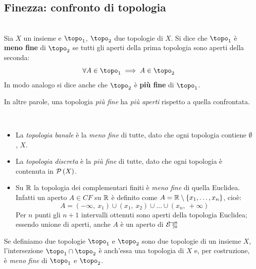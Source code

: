 \subsection{Finezza: confronto di topologia}
\begin{define}[Finezza.]~{}\\
Sia $X$ un insieme e $\topo_1$, $\topo_2$ due topologie di $X$. Si dice che $\topo_1$ è \textbf{meno fine} di $\topo_2$ se tutti gli aperti della prima topologia sono aperti della seconda:
\vspace{-2mm}
\begin{equation}
\forall A\in\topo_1\implies A\in \topo_2
\end{equation}
In modo analogo si dice anche che $\topo_2$ è \textbf{più fine} di $\topo_1$.
\end{define}
In altre parole, una topologia \textit{più fine} ha \textit{più aperti} rispetto a quella confrontata.
\begin{examples}~{}
\begin{itemize}
\item La \textit{topologia banale} è la \textit{meno fine} di tutte, dato che ogni topologia contiene $\emptyset$, $X$.
\item La \textit{topologia discreta} è la \textit{più fine} di tutte, dato che ogni topologia è contenuta in $\mathcal{P}\left(X\right)$.
\item Su $\mathbb{R}$ la topologia dei complementari finiti è \textit{meno fine} di quella Euclidea. Infatti un aperto $A\in CF$ su $\mathbb{R}$ è definito come $A=\mathbb{R}\setminus\left\{x_1,\ldots,x_n\right\}$, cioè:
\begin{equation*}
A=\left(-\infty,\ x_1\right)\cup\left(x_1,\ x_2\right)\cup\ldots\cup\left(x_n,\ +\infty\right)
\end{equation*}
Per $n$ punti gli $n+1$ intervalli ottenuti sono aperti della topologia Euclidea; essendo unione di aperti, anche $A$ è un aperto di $\mathcal{E\! u\! c\! l}$
\end{itemize}
\vspace{-3mm}
\end{examples}
\begin{observe}\label{intersezionetopo}
	Se definiamo due topologie $\topo_1$ e $\topo_2$ sono due topologie di un insieme $X$, l'intersezione $\topo_1\cap\topo_2$ è anch'essa una topologia di $X$ e, per costruzione, è \textit{meno fine} di $\topo_1$ e $\topo_2$.
\end{observe}

